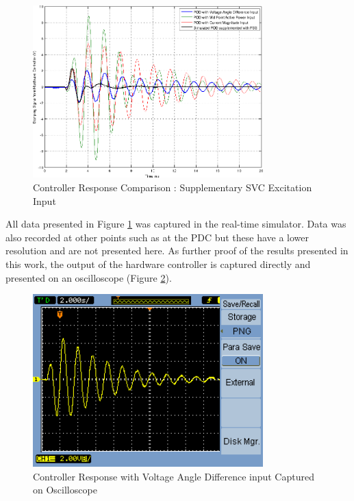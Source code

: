 \documentclass[journal]{IEEEtran}
\begin{document}

\begin{figure}[!th]
\centering
\includegraphics[width=3.5in]{SVC_ResponseComparison_Labelled_NoVMag.png}
\caption{Controller Response Comparison : Supplementary SVC Excitation Input}
\label{SVC_Plots}
\end{figure}


All data presented in Figure \ref{SVC_Plots} was captured in the real-time simulator. Data was also recorded at other points such as at the PDC but these have a lower resolution and are not presented here. As further proof of the results presented in this work, the output of the hardware controller is captured directly and presented on an oscilloscope (Figure \ref{ScopeCapture}).

\begin{figure}[!th]
\centering
\includegraphics[width=3.5in]{Best_sample.png}
\caption{Controller Response with Voltage Angle Difference input Captured on Oscilloscope}
\label{ScopeCapture}
\end{figure}
\end{document}
